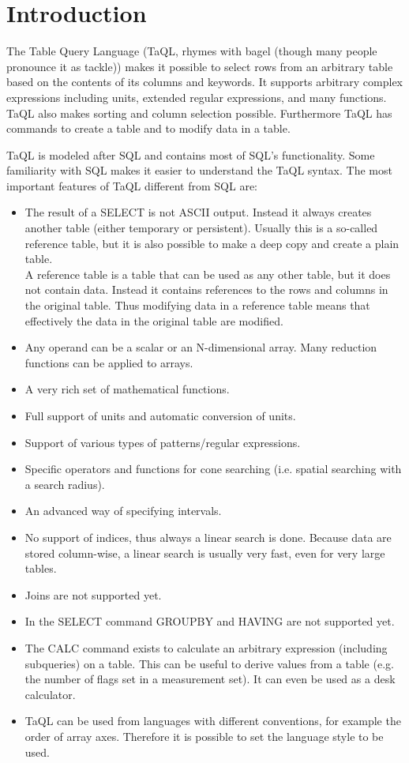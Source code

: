 

\section{Introduction}
The Table Query Language (TaQL, rhymes with bagel (though many people
pronounce it as tackle)) makes it possible to select
rows from an arbitrary table based on the contents of its
columns and keywords. It supports arbitrary complex
expressions including units, extended regular expressions, and many functions.
TaQL also makes sorting and column selection possible.
Furthermore TaQL has commands to create a table and to modify data
in a table.

TaQL is modeled after SQL and contains most of SQL's
functionality. Some familiarity with SQL makes it easier to understand
the TaQL syntax.
The most important features of TaQL different from SQL are:
\begin{itemize}
\item The result of a SELECT is not ASCII output. Instead it always
creates another table (either temporary or persistent). Usually this
is a so-called reference table, but it is also possible to make a deep
copy and create a plain table.
\\A reference table is a table that can be used as any other table,
but it does not contain data. Instead it contains references to the
rows and columns in the original table. Thus modifying data in a
reference table means that effectively the data in the original
table are modified.
\item Any operand can be a scalar or an N-dimensional array.
Many reduction functions can be applied to arrays.
\item A very rich set of mathematical functions.
\item Full support of units and automatic conversion of units.
\item Support of various types of patterns/regular expressions.
\item Specific operators and functions for cone searching
(i.e. spatial searching with a search radius).
\item An advanced way of specifying intervals.
\item No support of indices, thus always a linear search is done.
Because data are stored column-wise, a linear search is usually very
 fast, even for very large tables.
\item Joins are not supported yet.
\item In the SELECT command GROUPBY and HAVING are not supported yet.
\item The CALC command exists to
calculate an arbitrary expression (including subqueries) on a
table. This can be useful to derive values from a table (e.g. the
number of flags set in a measurement set). It can even be used as a
desk calculator.
\item TaQL can be used from languages with different conventions, for
example the order of array axes. Therefore it is possible to set the
language style to be used.
\end{itemize}

